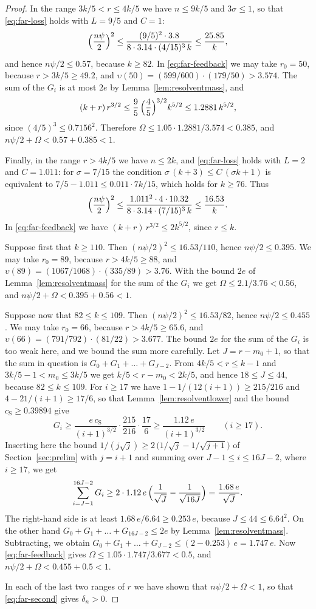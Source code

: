 \documentclass{amsart}
\theoremstyle{definition}
\theoremstyle{remark}
\numberwithin{equation}{section}
\begin{document}
\begin{proof}
In the range $3k/5<r\le4k/5$ we have $n\le9k/5$ and $3\sigma\le1$, so
that \eqref{eq:far-loss} holds with $L=9/5$ and $C=1$:
\[
\Bigl(\frac{n\psi}{2}\Bigr)^2
\le\frac{(9/5)^2\cdot3.8}{8\cdot3.14\cdot(4/15)^3\,k}
\le\frac{25.85}{k},
\]
and hence $n\psi/2\le0.57$, because $k\ge82$. In \eqref{eq:far-feedback} we
may take $r_0=50$,
because $r>3k/5\ge49.2$, and $\upsilon(50)=(599/600)\cdot(179/50)>3.574$. The sum
of the $G_i$ is at most $2e$ by Lemma~\ref{lem:resolventmass}, and
\[
(k+r)\,r^{3/2}\le\frac95\,\Bigl(\frac45\Bigr)^{3/2}k^{5/2}\le1.2881\,k^{5/2},
\]
since $(4/5)^3\le0.7156^2$. Therefore
$\Omega\le1.05\cdot1.2881/3.574<0.385$, and
$n\psi/2+\Omega<0.57+0.385<1$.

Finally, in the range $r>4k/5$ we have $n\le2k$, and \eqref{eq:far-loss}
holds with $L=2$ and $C=1.011$: for $\sigma=7/15$ the condition
$\sigma\,(k+3)\le C\,(\sigma k+1)$ is equivalent to
$7/5-1.011\le0.011\cdot7k/15$, which holds for $k\ge76$. Thus
\[
\Bigl(\frac{n\psi}{2}\Bigr)^2
\le\frac{1.011^2\cdot4\cdot10.32}{8\cdot3.14\cdot(7/15)^3\,k}
\le\frac{16.53}{k}.
\]
In \eqref{eq:far-feedback} we have $(k+r)\,r^{3/2}\le2k^{5/2}$, since
$r\le k$.

Suppose first that $k\ge110$. Then $(n\psi/2)^2\le16.53/110$, hence
$n\psi/2\le0.395$. We may take $r_0=89$, because $r>4k/5\ge88$, and
$\upsilon(89)=(1067/1068)\cdot(335/89)>3.76$. With the bound $2e$ of
Lemma~\ref{lem:resolventmass} for the sum of the $G_i$ we get
$\Omega\le2.1/3.76<0.56$, and $n\psi/2+\Omega<0.395+0.56<1$.

Suppose now that $82\le k\le109$. Then $(n\psi/2)^2\le16.53/82$,
hence $n\psi/2\le0.455$. We may take $r_0=66$, because $r>4k/5\ge65.6$, and
$\upsilon(66)=(791/792)\cdot(81/22)>3.677$. The bound $2e$ for the sum of the
$G_i$ is too weak here, and we bound the sum more
carefully. Let $J=r-m_0+1$, so that the sum in question is
$G_0+G_1+\dots+G_{J-2}$. From $4k/5<r\le k-1$ and $3k/5-1<m_0\le3k/5$ we get
$k/5<r-m_0<2k/5$, and hence $18\le J\le44$, because $82\le k\le109$. For
$i\ge17$ we have $1-1/(12(i+1))\ge215/216$ and
$4-21/(i+1)\ge17/6$, so that Lemma~\ref{lem:resolventlower} and the bound
$c_{\mathrm S}\ge0.39894$ give
\[
G_i\ge\frac{e\,c_{\mathrm S}}{(i+1)^{3/2}}\cdot\frac{215}{216}\cdot\frac{17}{6}
\ge\frac{1.12\,e}{(i+1)^{3/2}}\qquad(i\ge17).
\]
Inserting here the bound
$1/(j\sqrt j)\ge2\,\bigl(1/\sqrt j-1/\sqrt{j+1}\bigr)$ of
Section~\ref{sec:prelim} with $j=i+1$ and summing over
$J-1\le i\le16J-2$, where $i\ge17$, we get
\[
\sum_{i=J-1}^{16J-2}G_i
\ge2\cdot1.12\,e\,\Bigl(\frac{1}{\sqrt J}-\frac{1}{\sqrt{16J}}\Bigr)
=\frac{1.68\,e}{\sqrt J}.
\]
The right-hand side is at least $1.68\,e/6.64\ge0.253\,e$, because
$J\le44\le6.64^2$. On the other hand $G_0+G_1+\dots+G_{16J-2}\le2e$ by
Lemma~\ref{lem:resolventmass}. Subtracting, we obtain
$G_0+G_1+\dots+G_{J-2}\le(2-0.253)\,e=1.747\,e$. Now
\eqref{eq:far-feedback} gives $\Omega\le1.05\cdot1.747/3.677<0.5$, and
$n\psi/2+\Omega<0.455+0.5<1$.

In each of the last two ranges of $r$ we have shown that
$n\psi/2+\Omega<1$, so that \eqref{eq:far-second} gives $\delta_n>0$.
\end{proof}
\end{document}
